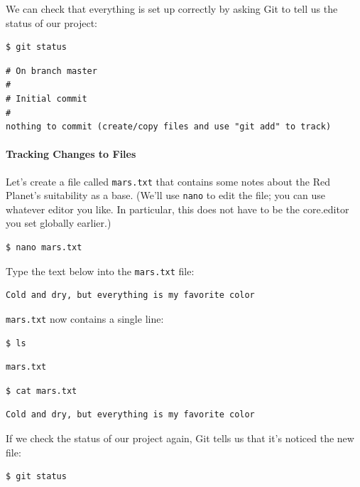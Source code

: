 \documentclass[]{book}
\begin{document}
We can check that everything is set up correctly by asking Git to tell
us the status of our project:

\begin{verbatim}
$ git status
\end{verbatim}

\begin{verbatim}
# On branch master
#
# Initial commit
#
nothing to commit (create/copy files and use "git add" to track)
\end{verbatim}

\mbox{}\paragraph{Tracking Changes to Files}

Let's create a file called \texttt{mars.txt} that contains some notes
about the Red Planet's suitability as a base. (We'll use \texttt{nano}
to edit the file; you can use whatever editor you like. In particular,
this does not have to be the core.editor you set globally earlier.)

\begin{verbatim}
$ nano mars.txt
\end{verbatim}

Type the text below into the \texttt{mars.txt} file:

\begin{verbatim}
Cold and dry, but everything is my favorite color
\end{verbatim}

\texttt{mars.txt} now contains a single line:

\begin{verbatim}
$ ls
\end{verbatim}

\begin{verbatim}
mars.txt
\end{verbatim}

\begin{verbatim}
$ cat mars.txt
\end{verbatim}

\begin{verbatim}
Cold and dry, but everything is my favorite color
\end{verbatim}

If we check the status of our project again, Git tells us that it's
noticed the new file:

\begin{verbatim}
$ git status
\end{verbatim}
\end{document}
